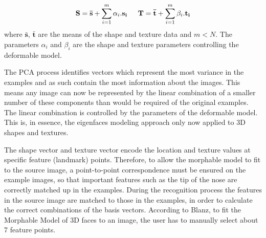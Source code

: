 \documentclass[11pt,a4paper,twoside]{report}
\begin{document}
\begin{equation}\label{eq:morhpable_pca}
\mathbf{S} = \mathbf{\bar{s}} + \sum_{i=1}^m\alpha_i.\mathbf{s_i} \indent \mathbf{T} = \mathbf{\bar{t}} + \sum_{i=1}^m\beta_i.\mathbf{t_i}
\end{equation}
where $\mathbf{\bar{s}}$, $\mathbf{\bar{t}}$ are the means of the shape and
texture data and $m < N$. The parameters $\alpha_i$ and $\beta_i$ are the
shape and texture parameters controlling the deformable model.

The PCA process identifies vectors which represent the most variance in
the examples and as such contain the most information about
the images. This means any image can now be represented by the linear
combination of a smaller number of these components than would be
required of the original examples. The linear combination is controlled by the
parameters of the deformable model. This is, in essence, the eigenfaces modeling approach
only now applied to 3D shapes and textures.

The shape vector and texture vector encode the location and texture values at
specific feature (landmark) points. Therefore, to allow the morphable model to fit to the source image, a
point-to-point correspondence must be ensured on the example
images, so that important features such as the tip of the nose are
correctly matched up in the examples. During the recognition process the features in the source image are matched to those in the examples, in order to
calculate the correct combinations of the basis vectors. According to Blanz, to fit the Morphable Model of 3D faces to an image, the user has to manually select
about 7 feature points. 
\end{document}
